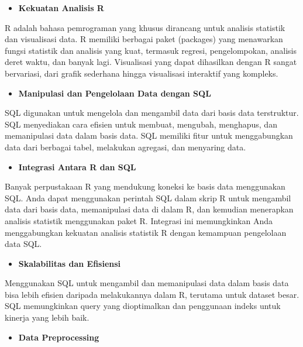 \documentclass[
]{book}
\providecommand{\tightlist}{%
  \setlength{\itemsep}{0pt}\setlength{\parskip}{0pt}}
\begin{document}
\begin{itemize}
\tightlist
\item
  \textbf{Kekuatan Analisis R}
\end{itemize}

R adalah bahasa pemrograman yang khusus dirancang untuk analisis statistik dan visualisasi data.
R memiliki berbagai paket (packages) yang menawarkan fungsi statistik dan analisis yang kuat, termasuk regresi, pengelompokan, analisis deret waktu, dan banyak lagi.
Visualisasi yang dapat dihasilkan dengan R sangat bervariasi, dari grafik sederhana hingga visualisasi interaktif yang kompleks.

\begin{itemize}
\tightlist
\item
  \textbf{Manipulasi dan Pengelolaan Data dengan SQL}
\end{itemize}

SQL digunakan untuk mengelola dan mengambil data dari basis data terstruktur.
SQL menyediakan cara efisien untuk membuat, mengubah, menghapus, dan memanipulasi data dalam basis data.
SQL memiliki fitur untuk menggabungkan data dari berbagai tabel, melakukan agregasi, dan menyaring data.

\begin{itemize}
\tightlist
\item
  \textbf{Integrasi Antara R dan SQL}
\end{itemize}

Banyak perpustakaan R yang mendukung koneksi ke basis data menggunakan SQL.
Anda dapat menggunakan perintah SQL dalam skrip R untuk mengambil data dari basis data, memanipulasi data di dalam R, dan kemudian menerapkan analisis statistik menggunakan paket R. Integrasi ini memungkinkan Anda menggabungkan kekuatan analisis statistik R dengan kemampuan pengelolaan data SQL.

\begin{itemize}
\tightlist
\item
  \textbf{Skalabilitas dan Efisiensi}
\end{itemize}

Menggunakan SQL untuk mengambil dan memanipulasi data dalam basis data bisa lebih efisien daripada melakukannya dalam R, terutama untuk dataset besar.
SQL memungkinkan query yang dioptimalkan dan penggunaan indeks untuk kinerja yang lebih baik.

\begin{itemize}
\tightlist
\item
  \textbf{Data Preprocessing}
\end{itemize}
\end{document}
